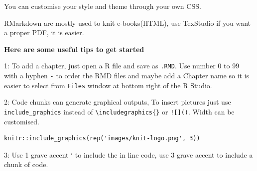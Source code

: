 \documentclass[
]{book}
\begin{document}
You can customise your style and theme through your own CSS.

RMarkdown are mostly used to knit e-books(HTML), use TexStudio if you want a proper PDF, it is easier.

\textbf{Here are some useful tips to get started}

1: To add a chapter, just open a R file and save as \texttt{.RMD}. Use number 0 to 99 with a hyphen \texttt{-} to order the RMD files and maybe add a Chapter name so it is easier to select from \texttt{Files} window at bottom right of the R Studio.

2: Code chunks can generate graphical outputs, To insert pictures just use \texttt{include\_graphics} instead of \texttt{\textbackslash{}includegraphics\{\}} or \texttt{!{[}{]}()}. Width can be customised.

\begin{verbatim}
knitr::include_graphics(rep('images/knit-logo.png', 3))
\end{verbatim}

3: Use 1 grave accent ` to include the in line code, use 3 grave accent to include a chunk of code.

  
\end{document}
